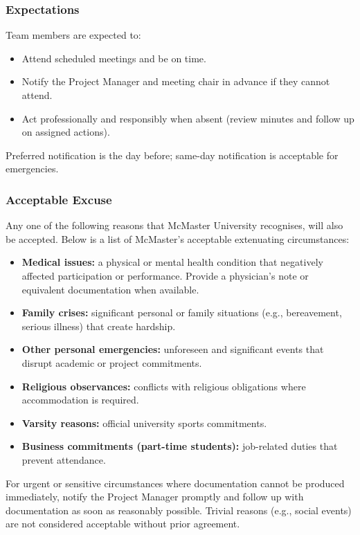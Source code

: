 \documentclass{article}
\begin{document}
\subsubsection*{Expectations}

Team members are expected to: 
\begin{itemize}
  \item Attend scheduled meetings and be on time.
  \item Notify the Project Manager and meeting chair in advance if they cannot attend.
  \item Act professionally and responsibly when absent (review minutes and follow up on assigned actions).
\end{itemize}

Preferred notification is the day before; same-day notification is acceptable for emergencies.

\subsubsection*{Acceptable Excuse}

Any one of the following reasons that McMaster University recognises, will also be accepted. Below is a list of McMaster's acceptable extenuating circumstances:

\begin{itemize}
  \item \textbf{Medical issues:} a physical or mental health condition that negatively affected participation or performance. Provide a physician's note or equivalent documentation when available.
  \item \textbf{Family crises:} significant personal or family situations (e.g., bereavement, serious illness) that create hardship.
  \item \textbf{Other personal emergencies:} unforeseen and significant events that disrupt academic or project commitments.
  \item \textbf{Religious observances:} conflicts with religious obligations where accommodation is required.
  \item \textbf{Varsity reasons:} official university sports commitments.
  \item \textbf{Business commitments (part-time students):} job-related duties that prevent attendance.
\end{itemize}

For urgent or sensitive circumstances where documentation cannot be produced immediately, notify the Project Manager promptly and follow up with documentation as soon as reasonably possible. Trivial reasons (e.g., social events) are not considered acceptable without prior agreement.
\end{document}
